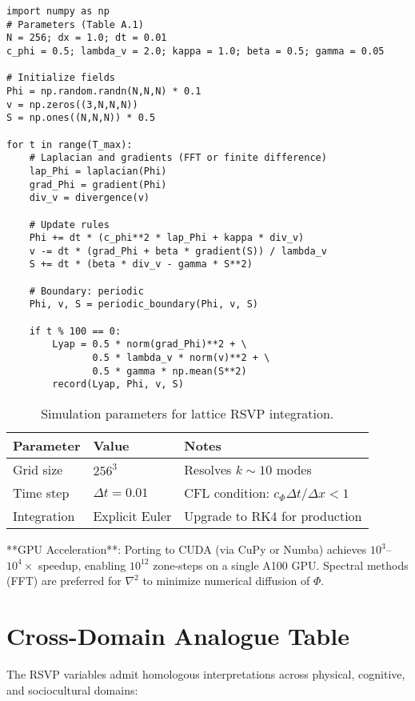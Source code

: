 \documentclass[12pt,a4paper]{article}
\begin{document}
\begin{verbatim}
import numpy as np
# Parameters (Table A.1)
N = 256; dx = 1.0; dt = 0.01
c_phi = 0.5; lambda_v = 2.0; kappa = 1.0; beta = 0.5; gamma = 0.05

# Initialize fields
Phi = np.random.randn(N,N,N) * 0.1
v = np.zeros((3,N,N,N))
S = np.ones((N,N,N)) * 0.5

for t in range(T_max):
    # Laplacian and gradients (FFT or finite difference)
    lap_Phi = laplacian(Phi)
    grad_Phi = gradient(Phi)
    div_v = divergence(v)
    
    # Update rules
    Phi += dt * (c_phi**2 * lap_Phi + kappa * div_v)
    v -= dt * (grad_Phi + beta * gradient(S)) / lambda_v
    S += dt * (beta * div_v - gamma * S**2)
    
    # Boundary: periodic
    Phi, v, S = periodic_boundary(Phi, v, S)
    
    if t % 100 == 0:
        Lyap = 0.5 * norm(grad_Phi)**2 + \
               0.5 * lambda_v * norm(v)**2 + \
               0.5 * gamma * np.mean(S**2)
        record(Lyap, Phi, v, S)
\end{verbatim}

\begin{table}[h]
\centering
\begin{tabular}{@{}lll@{}}
\toprule
\textbf{Parameter} & \textbf{Value} & \textbf{Notes} \\
\midrule
Grid size & $256^3$ & Resolves $k \sim 10$ modes \\
Time step & $\Delta t = 0.01$ & CFL condition: $c_\Phi \Delta t / \Delta x < 1$ \\
Integration & Explicit Euler & Upgrade to RK4 for production \\
\bottomrule
\end{tabular}
\caption{Simulation parameters for lattice RSVP integration.}
\end{table}

**GPU Acceleration**: Porting to CUDA (via CuPy or Numba) achieves $10^3$--$10^4\times$ speedup, enabling $10^{12}$ zone-steps on a single A100 GPU. Spectral methods (FFT) are preferred for $\nabla^2$ to minimize numerical diffusion of $\Phi$.

\section{Cross-Domain Analogue Table}

The RSVP variables admit homologous interpretations across physical, cognitive, and sociocultural domains:
\end{document}
